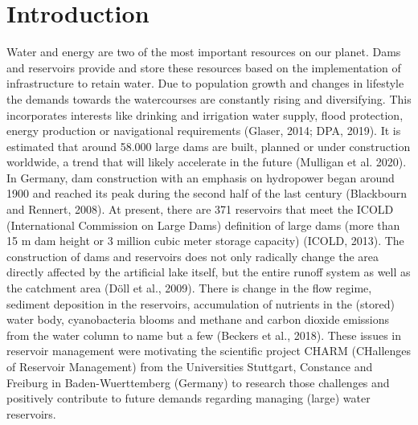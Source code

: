 \section{Introduction}
\label{intro}
Water and energy are two of the most important resources on our planet. Dams and reservoirs provide and store these resources based on the implementation of infrastructure to retain water. Due to population growth and changes in lifestyle the demands towards the watercourses are constantly rising and diversifying. This incorporates interests like drinking and irrigation water supply, flood protection, energy production or navigational requirements (Glaser, 2014; DPA, 2019). It is estimated that around 58.000 large dams are built, planned or under construction worldwide, a trend that will likely accelerate in the future (Mulligan et al. 2020). In Germany, dam construction with an emphasis on hydropower began around 1900 and reached its peak during the second half of the last century (Blackbourn and Rennert, 2008). At present, there are 371 reservoirs that meet the ICOLD (International Commission on Large Dams) definition of large dams (more than 15 m dam height or 3 million cubic meter storage capacity) (ICOLD, 2013). The construction of dams and reservoirs does not only radically change the area directly affected by the artificial lake itself, but the entire runoff system as well as the catchment area (Döll et al., 2009). There is change in the flow regime, sediment deposition in the reservoirs, accumulation of nutrients in the (stored) water body, cyanobacteria blooms and methane and carbon dioxide emissions from the water column to name but a few (Beckers et al., 2018). These issues in reservoir management were motivating the scientific project CHARM (CHallenges of Reservoir Management) from the Universities Stuttgart, Constance and Freiburg in Baden-Wuerttemberg (Germany) to research those challenges and positively contribute to future demands regarding managing (large) water reservoirs. 

